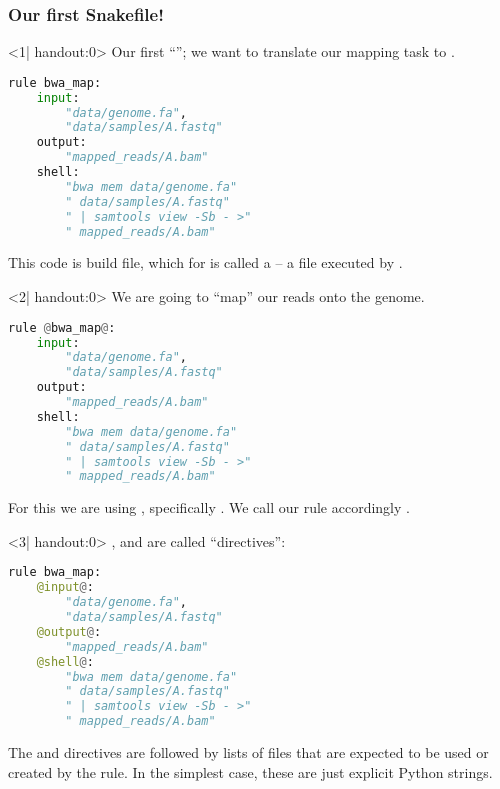 \begin{frame}[fragile]
  \frametitle{Our first Snakefile!}
  \begin{onlyenv}<1| handout:0>
    Our first ``''; we want to translate our mapping task to \Snakemake. 
    \begin{lstlisting}[language=Python,style=Python]
rule bwa_map:
    input:
        "data/genome.fa",
        "data/samples/A.fastq"
    output:
        "mapped_reads/A.bam"
    shell:
        "bwa mem data/genome.fa"
        " data/samples/A.fastq"
        " | samtools view -Sb - >"
        " mapped_reads/A.bam"
    \end{lstlisting}
    \begin{docs}
    	This code is build file, which for \Snakemake{} is called a  -- a file executed by \Snakemake{}.
    \end{docs}
    \end{onlyenv}
  \begin{onlyenv}<2| handout:0>
   We are going to ``map'' our reads onto the genome.
   \begin{lstlisting}[language=Python,style=Python]
rule @bwa_map@:
    input:
        "data/genome.fa",
        "data/samples/A.fastq"
    output:
        "mapped_reads/A.bam"
    shell:
        "bwa mem data/genome.fa"
        " data/samples/A.fastq"
        " | samtools view -Sb - >"
        " mapped_reads/A.bam"
    \end{lstlisting}
    For this we are using , specifically . We call our rule accordingly .
  \end{onlyenv}
  \begin{onlyenv}<3| handout:0>
   ,  and  are called ``directives'':
   \begin{lstlisting}[language=Python,style=Python]
rule bwa_map:
    @input@:
        "data/genome.fa",
        "data/samples/A.fastq"
    @output@:
        "mapped_reads/A.bam"
    @shell@:
        "bwa mem data/genome.fa"
        " data/samples/A.fastq"
        " | samtools view -Sb - >"
        " mapped_reads/A.bam"
    \end{lstlisting}
    The  and  directives are followed by lists of files that are expected to be used or created by the rule. In the simplest case, these are just explicit Python strings.
  \end{onlyenv}

\end{frame}
